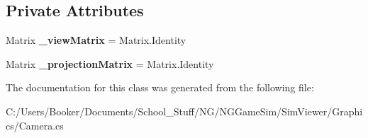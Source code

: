 \subsection*{Private Attributes}
\begin{DoxyCompactItemize}
\item 
\mbox{\label{class_n_g_sim_1_1_graphics_1_1_camera_a49dfdd115f0604cb6f05a43c3a80866e}} 
Matrix {\bfseries \+\_\+view\+Matrix} = Matrix.\+Identity
\item 
\mbox{\label{class_n_g_sim_1_1_graphics_1_1_camera_acc71f384f7c9b3a72056ac0076787bd1}} 
Matrix {\bfseries \+\_\+projection\+Matrix} = Matrix.\+Identity
\end{DoxyCompactItemize}


The documentation for this class was generated from the following file\+:\begin{DoxyCompactItemize}
\item 
C\+:/\+Users/\+Booker/\+Documents/\+School\+\_\+\+Stuff/\+N\+G/\+N\+G\+Game\+Sim/\+Sim\+Viewer/\+Graphics/Camera.\+cs\end{DoxyCompactItemize}
